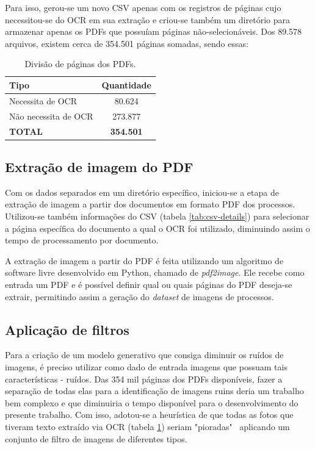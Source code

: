 Para isso, gerou-se um novo CSV apenas com os registros de páginas cujo necessitou-se do OCR em sua extração e criou-se também um diretório para armazenar apenas os PDFs que possuíam páginas não-selecionáveis. Dos 89.578 arquivos, existem cerca de 354.501 páginas somadas, sendo essas:

\begin{table}[H]
  \centering
  \caption{Divisão de páginas dos PDFs.}
  \begin{tabular}{|m{10em}|c|}
    \hline
      \textbf{Tipo}  &
      \textbf{Quantidade} \\
    \hline
      Necessita de OCR  &
      80.624 \\
    \hline
      Não necessita de OCR  &
      273.877 \\
    \hline
      \textbf{TOTAL}  &
      \textbf{354.501} \\
    \hline
  \end{tabular}
  \label{tab:csv-diff}
\end{table}

\subsection{Extração de imagem do PDF}
Com os dados separados em um diretório específico, iniciou-se a etapa de extração de imagem a partir dos documentos em formato PDF dos processos. Utilizou-se também informações do CSV (tabela \ref{tab:csv-details}) para selecionar a página específica do documento a qual o OCR foi utilizado, diminuindo assim o tempo de processamento por documento.

A extração de imagem a partir do PDF é feita utilizando um algoritmo de software livre desenvolvido em Python, chamado de \textit{pdf2image}. Ele recebe como entrada um PDF e é possível definir qual ou quais páginas do PDF deseja-se extrair, permitindo assim a geração do \textit{dataset} de imagens de processos.

\subsection{Aplicação de filtros}
Para a criação de um modelo generativo que consiga diminuir os ruídos de imagens, é preciso utilizar como dado de entrada imagens que possuam tais características - ruídos. Das 354 mil páginas dos PDFs disponíveis, fazer a separação de todas elas para a identificação de imagens ruins deria um trabalho bem complexo e que diminuiria o tempo disponível para o desenvolvimento do presente trabalho. Com isso, adotou-se a heurística de que todas as fotos que tiveram texto extraído via OCR (tabela \ref{tab:csv-diff}) seriam "pioradas" \  aplicando um conjunto de filtro de imagens de diferentes tipos.

